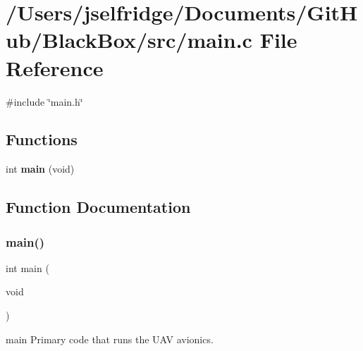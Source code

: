 \section{/\+Users/jselfridge/\+Documents/\+Git\+Hub/\+Black\+Box/src/main.c File Reference}
\label{main_8c}
{\ttfamily \#include \char`\"{}main.\+h\char`\"{}}\newline
\subsection*{Functions}
\begin{DoxyCompactItemize}
\item 
int \textbf{ main} (void)
\end{DoxyCompactItemize}


\subsection{Function Documentation}
\mbox{\label{main_8c_a840291bc02cba5474a4cb46a9b9566fe}} 
\subsubsection{main()}
{\footnotesize\ttfamily int main (\begin{DoxyParamCaption}\item[{void}]{ }\end{DoxyParamCaption})}

main Primary code that runs the U\+AV avionics. 